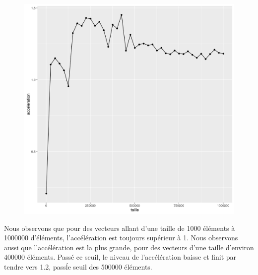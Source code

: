 \documentclass[a4paper,11pt]{scrartcl}
\begin{document}
\begin{figure}[H] \center
   \includegraphics[scale=0.5] {graphes/global_temps_machine_accel12.png}
\end{figure}

Nous observons que pour des vecteurs allant d'une taille de 1000 \'el\'ements \`a 1000000 d'\'el\'ements, l'acc\'el\'eration est toujours sup\'erieur \`a 1. Nous observons aussi que l'acc\'el\'eration est la plus grande, pour des vecteurs d'une taille d'environ 400000 \'el\'ements. Pass\'e ce seuil, le niveau de l'acc\'el\'eration baisse et finit par tendre vers 1.2, pass\' le seuil des 500000 \'el\'ements.   
\end{document}

